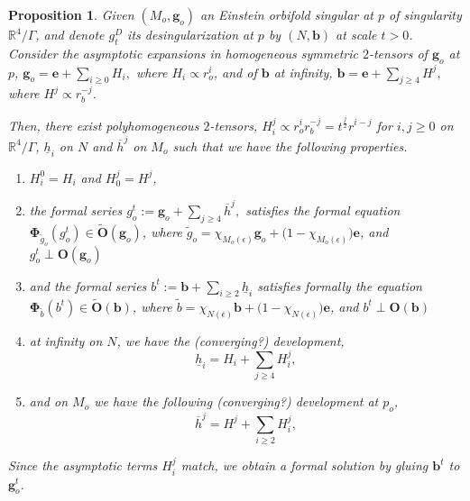 \documentclass[12pt]{article}
\newtheorem{prop}[thm]{Proposition}
\begin{document}
\begin{prop}\label{dvp formel desing}
    Given $(M_o,\mathbf{g}_o)$ an Einstein orbifold singular at $p$ of singularity $\mathbb{R}^4\slash\Gamma$, and denote $g^D_t$ its desingularization at $p$ by $(N,\mathbf{b})$ at scale $t>0$. Consider the asymptotic expansions in homogeneous symmetric $2$-tensors of $\mathbf{g}_o$ at $p$, $\mathbf{g}_o = \mathbf{e} + \sum_{i\geqslant 0} H_i,$ where $H_i\propto r_o^i$, and of $\mathbf{b}$ at infinity, 
    $\mathbf{b} = \mathbf{e} + \sum_{j\geqslant 4} H^j,$ where  $H^j\propto r_b^{-j}$.
    
    Then, there exist polyhomogeneous $2$-tensors, $H^j_i \propto r^{i}_or_b^{-j} = t^\frac{j}{2} r^{i-j}$ for $i,j\geqslant 0$ on $\mathbb{R}^4\slash\Gamma$, $\underline{h}_i$ on $N$ and $\overline{h}^j$ on $M_o$ such that we have the following properties.
    \begin{enumerate}
        \item $H^0_i = H_i$ and $H_0^j = H^j$,
        \item the formal series
        $g_{o}^t:=\mathbf{g}_o + \sum_{j\geqslant 4} \overline{h}^j,$
        satisfies the formal equation $\mathbf{\Phi}_{\tilde{g}_o}(g^t_o) \in \tilde{\mathbf{O}}(\mathbf{g}_o)$, where $\tilde{g}_o = \chi_{M_o(\epsilon)}\mathbf{g}_o + \big(1-\chi_{M_o(\epsilon)}\big)\mathbf{e}$, and $ g_o^t\perp \mathbf{O}(\mathbf{g}_o) $
        \item and the formal series
        $b^t:=\mathbf{b} + \sum_{i\geqslant 2}\underline{h}_i$
        satisfies formally the equation 
        $\mathbf{\Phi}_{\tilde{b}}(b^t) \in \tilde{\mathbf{O}}(\mathbf{b})$,
        where $\tilde{b} = \chi_{N(\epsilon)}\mathbf{b} + \big(1-\chi_{N(\epsilon)}\big)\mathbf{e}$, and $ b^t\perp \mathbf{O}(\mathbf{b}) $
        \item at infinity on $N$, we have the (converging?) development,
        \begin{equation}
            \underline{h}_i = H_i+\sum_{j\geqslant 4} H^j_i,
        \end{equation}
        \item and on $M_o$ we have the following (converging?) development at $p_o$,
        \begin{equation}
            \overline{h}^j = H^j+\sum_{i\geqslant 2}H^j_i,
        \end{equation}
    \end{enumerate}
    Since the asymptotic terms $H_i^j$ match, we obtain a formal solution by gluing $\mathbf{b}^t$ to $\mathbf{g}_o^t$.
\end{prop}
\end{document}
